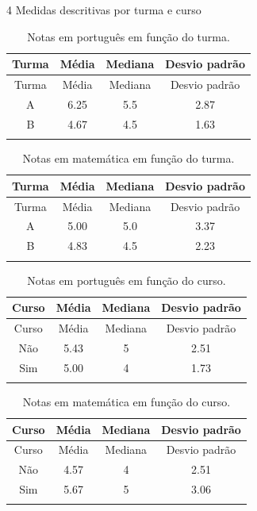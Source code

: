 \documentclass[
  ignorenonframetext,
  serif,
  professionalfont,
  usenames,
  dvipsnames,
  aspectratio = 169]{beamer}
\def\beginAHalfColumn{\begin{minipage}{0.49\textwidth}}%
\def\endColumns{\end{minipage}}%
\begin{document}
\begin{frame}{4 Medidas descritivas por turma e curso}
\label{medidas-descritivas-por-turma-e-curso}
\beginAHalfColumn

\small

\begin{longtable}[]{@{}cccc@{}}
\caption{Notas em português em função do turma.}\tabularnewline
\toprule\noalign{}
Turma & Média & Mediana & Desvio padrão \\
\midrule\noalign{}
\endfirsthead
\toprule\noalign{}
Turma & Média & Mediana & Desvio padrão \\
\midrule\noalign{}
\endhead
A & 6.25 & 5.5 & 2.87 \\
B & 4.67 & 4.5 & 1.63 \\
\bottomrule\noalign{}
\end{longtable}

\begin{longtable}[]{@{}cccc@{}}
\caption{Notas em matemática em função do turma.}\tabularnewline
\toprule\noalign{}
Turma & Média & Mediana & Desvio padrão \\
\midrule\noalign{}
\endfirsthead
\toprule\noalign{}
Turma & Média & Mediana & Desvio padrão \\
\midrule\noalign{}
\endhead
A & 5.00 & 5.0 & 3.37 \\
B & 4.83 & 4.5 & 2.23 \\
\bottomrule\noalign{}
\end{longtable}

\endColumns
\beginAHalfColumn

\small

\begin{longtable}[]{@{}cccc@{}}
\caption{Notas em português em função do curso.}\tabularnewline
\toprule\noalign{}
Curso & Média & Mediana & Desvio padrão \\
\midrule\noalign{}
\endfirsthead
\toprule\noalign{}
Curso & Média & Mediana & Desvio padrão \\
\midrule\noalign{}
\endhead
Não & 5.43 & 5 & 2.51 \\
Sim & 5.00 & 4 & 1.73 \\
\bottomrule\noalign{}
\end{longtable}

\begin{longtable}[]{@{}cccc@{}}
\caption{Notas em matemática em função do curso.}\tabularnewline
\toprule\noalign{}
Curso & Média & Mediana & Desvio padrão \\
\midrule\noalign{}
\endfirsthead
\toprule\noalign{}
Curso & Média & Mediana & Desvio padrão \\
\midrule\noalign{}
\endhead
Não & 4.57 & 4 & 2.51 \\
Sim & 5.67 & 5 & 3.06 \\
\bottomrule\noalign{}
\end{longtable}

\endColumns
\end{frame}
\end{document}
